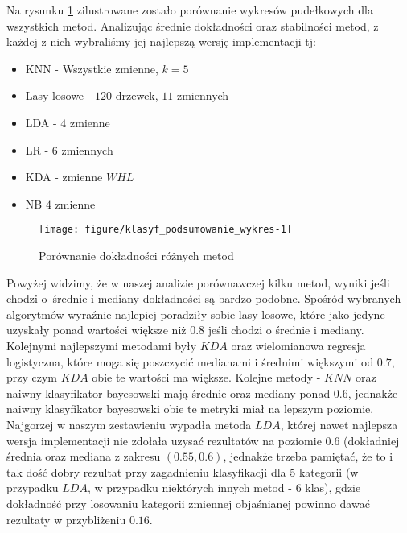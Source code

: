 \documentclass[12pt, a4paper]{article}\usepackage[]{graphicx}\usepackage[]{xcolor}
\makeatletter
\def\maxwidth{ %
  \ifdim\Gin@nat@width>\linewidth
    \linewidth
  \else
    \Gin@nat@width
  \fi
}
\newenvironment{knitrout}{}{} %
\makeatother
\begin{document}
Na rysunku \ref{fig:klasyf_podsumowanie_wykres} zilustrowane zostało porównanie wykresów pudełkowych dla wszystkich metod. Analizując średnie dokładności oraz stabilności metod, z każdej z nich wybraliśmy jej najlepszą wersję implementacji tj:
\begin{itemize}
\item KNN - Wszystkie zmienne, $k=5$
\item Lasy losowe - $120$ drzewek, $11$ zmiennych
\item LDA - $4$ zmienne
\item LR - $6$ zmiennych
\item KDA - zmienne $WHL$
\item NB $4$ zmienne
\end{itemize}



\begin{knitrout}
\color{fgcolor}\begin{figure}[H]

{\centering \texttt{[image: figure/klasyf\_podsumowanie\_wykres-1]} 

}

\caption[Porównanie dokładności różnych metod]{Porównanie dokładności różnych metod}\label{fig:klasyf_podsumowanie_wykres}
\end{figure}

\end{knitrout}
Powyżej widzimy, że w naszej analizie porównawczej kilku metod, wyniki jeśli chodzi o~średnie i mediany dokładności są bardzo podobne. Spośród wybranych algorytmów wyraźnie najlepiej poradziły sobie lasy losowe, które jako jedyne uzyskały ponad wartości większe niż $0.8$ jeśli chodzi o średnie i mediany. Kolejnymi najlepszymi metodami były $KDA$ oraz wielomianowa regresja logistyczna, które moga się poszczycić medianami i średnimi większymi od $0.7$, przy czym $KDA$ obie te wartości ma większe. Kolejne metody - $KNN$ oraz naiwny klasyfikator bayesowski mają średnie oraz mediany ponad $0.6$, jednakże naiwny klasyfikator bayesowski obie te metryki miał na lepszym poziomie. Najgorzej w naszym zestawieniu wypadła metoda $LDA$, której nawet najlepsza wersja implementacji nie zdołała uzysać rezultatów na poziomie $0.6$ (dokładniej średnia oraz mediana z zakresu $(0.55, 0.6)$, jednakże trzeba pamiętać, że to i tak dość dobry rezultat przy zagadnieniu klasyfikacji dla $5$ kategorii (w przypadku $LDA$, w przypadku niektórych innych metod - $6$ klas), gdzie dokładność przy losowaniu kategorii zmiennej objaśnianej powinno dawać rezultaty w przybliżeniu $0.16$.
\end{document}
